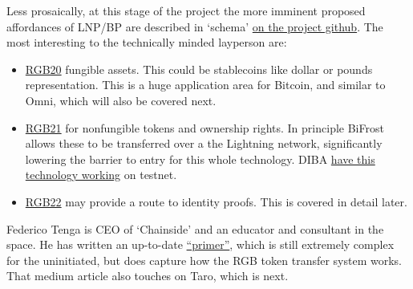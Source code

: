 Less prosaically, at this stage of the project the more imminent proposed affordances of LNP/BP are described in `schema' \href{https://github.com/LNP-BP/LNPBPs}{on the project github}. The most interesting to the technically minded layperson are:
\begin{itemize}
\item \href{https://github.com/LNP-BP/LNPBPs/blob/master/lnpbp-0020.md}{RGB20} fungible assets. This could be stablecoins like dollar or pounds representation. This is a huge application area for Bitcoin, and similar to Omni, which will also be covered next.
\item \href{https://github.com/LNP-BP/LNPBPs/blob/master/lnpbp-0021.md}{RGB21} for nonfungible tokens and ownership rights. In principle BiFrost allows these to be transferred over a the Lightning network, significantly lowering the barrier to entry for this whole technology. DIBA \href{https://diba.io/}{have this technology working} on testnet.
\item \href{https://github.com/LNP-BP/LNPBPs/issues/29}{RGB22} may provide a route to identity proofs. This is covered in detail later.
\end{itemize}
Federico Tenga is CEO of `Chainside' and an educator and consultant in the space. He has written an up-to-date \href{https://medium.com/@FedericoTenga/understanding-rgb-protocol-7dc7819d3059}{``primer''}, which is still extremely complex for the uninitiated, but does capture how the RGB token transfer system works. That medium article also touches on Taro, which is next.
